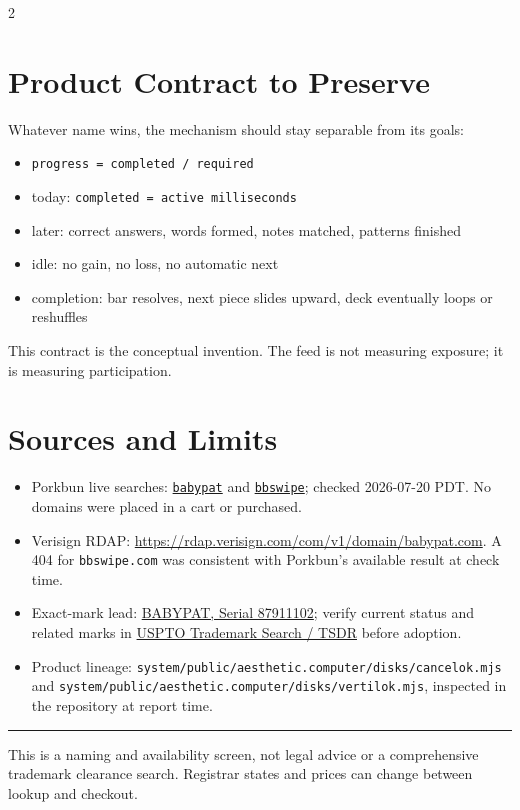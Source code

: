 \documentclass[9pt,letterpaper]{article}
\begin{document}
\begin{multicols}{2}
\section{Product Contract to Preserve}

Whatever name wins, the mechanism should stay separable from its goals:

\begin{itemize}
  \item \texttt{progress = completed / required}
  \item today: \texttt{completed = active milliseconds}
  \item later: correct answers, words formed, notes matched, patterns finished
  \item idle: no gain, no loss, no automatic next
  \item completion: bar resolves, next piece slides upward, deck eventually loops or reshuffles
\end{itemize}

This contract is the conceptual invention. The feed is not measuring exposure; it is measuring participation.

\section{Sources and Limits}

\begin{itemize}
  \item Porkbun live searches: \href{https://porkbun.com/checkout/search?q=babypat}{\texttt{babypat}} and \href{https://porkbun.com/checkout/search?q=bbswipe}{\texttt{bbswipe}}; checked 2026-07-20 PDT. No domains were placed in a cart or purchased.
  \item Verisign RDAP: \url{https://rdap.verisign.com/com/v1/domain/babypat.com}. A 404 for \texttt{bbswipe.com} was consistent with Porkbun's available result at check time.
  \item Exact-mark lead: \href{https://trademarks.justia.com/879/11/n-87911102.html}{BABYPAT, Serial 87911102}; verify current status and related marks in \href{https://www.uspto.gov/trademarks/search}{USPTO Trademark Search / TSDR} before adoption.
  \item Product lineage: \nolinkurl{system/public/aesthetic.computer/disks/cancelok.mjs} and \nolinkurl{system/public/aesthetic.computer/disks/vertilok.mjs}, inspected in the repository at report time.
\end{itemize}

\vspace{0.35em}
\hrule
\vspace{0.32em}
{\footnotesize\color{acgray}\noindent This is a naming and availability screen, not legal advice or a comprehensive trademark clearance search. Registrar states and prices can change between lookup and checkout.}

\end{multicols}
\end{document}
